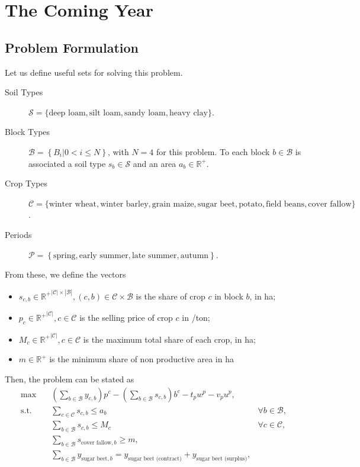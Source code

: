\section{The Coming Year}
\label{sec:a}

\subsection{Problem Formulation}
\label{sec:a1}

Let us define useful sets for solving this problem.
\begin{description}
\item[Soil Types] \(\mathcal{S} = \big\{ \text{deep loam}, \text{silt loam},
  \text{sandy loam}, \text{heavy clay} \big\}\).
\item[Block Types] \(\mathcal{B} = \left\{ B_i | 0 < i \leq N \right\}\),
  with \(N=4\) for this problem. To each block \(b \in \mathcal{B}\) is
  associated a soil type \(s_b \in \mathcal{S}\) and an area $a_{b} \in \mathbb{R}^+$.

\item[Crop Types]
  \(\mathcal{C} = \big\{ \text{winter wheat}, \text{winter barley}, \text{grain
    maize}, \text{sugar beet}, \text{potato}, \text{field beans}, \text{cover
    fallow} \big\}\).
\item[Periods] $\mathcal{P} = \left\{ \text{spring}, \text{early summer}, \text{late summer}, \text{autumn} \right\}$.
\end{description}
From these, we define the vectors
\begin{itemize}
\item $s_{c,b} \in \mathbb{R^+}^{|\mathcal{C}| \times |\mathcal{B}|}, (c, b) \in \mathcal{C} \times \mathcal{B}$ is the share of crop $c$ in block $b$, in ha;
\item $p_c \in \mathbb{R^+}^{|\mathcal{C}|}, c \in \mathcal{C}$ is the selling price of crop $c$ in \EUR/ton;
\item $M_c \in \mathbb{R^+}^{|\mathcal{C}|}, c \in \mathcal{C}$ is the maximum total share of each crop, in ha;
\item $m \in \mathbb{R^+}$ is the minimum share of non productive area in ha
\end{itemize}

Then, the problem can be stated as
\begin{align}
  \label{eq:1}
  \max \quad & \left( \sum_{b \in \mathcal{B}} y_{c,b} \right) p^c - \left( \sum_{b \in \mathcal{B}} s_{c,b} \right) b^c - t_p w^p - v_p u^p, & \\
  \text{s.t.} \quad & \sum_{c \in \mathcal{C}} s_{c,b} \leq a_b & \forall b \in \mathcal{B},\\
             & \sum_{b \in \mathcal{B}} s_{c,b} \leq M_c & \forall c \in \mathcal{C},\\
             & \sum_{b \in \mathcal{B}} s_{\text{cover fallow},b} \geq m,\\
             & \sum_{b \in \mathcal{B}} y_{\text{sugar beet}, b} = y_{\text{sugar beet (contract)}} + y _{\text{sugar beet (surplus)}},
\end{align}

